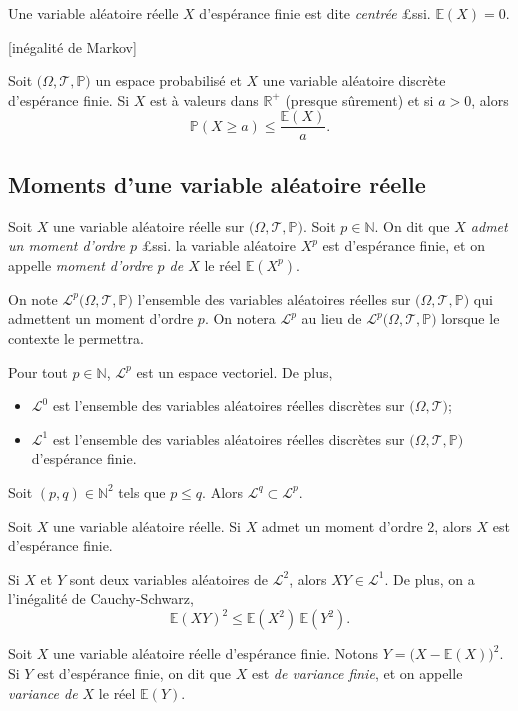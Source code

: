 \documentclass{yann}
\renewcommand{\T}{\mathscr{T}}
\newcommand{\Pro}{\bigl(Ω,\T\bigr)}
\newcommand{\Prob}{\bigl(Ω,\T,ℙ\bigr)}
\newcommand{\LL}[1]{\mathcal{L}^{#1}}
\begin{document}

Une variable aléatoire réelle $X$ d'espérance finie est dite \emph{centrée} £ssi. $𝔼(X) = 0$.

[inégalité de Markov]

Soit $\Prob$ un espace probabilisé et $X$ une variable aléatoire discrète d'espérance finie.
Si $X$ est à valeurs dans $ℝ^+$ (presque sûrement) et si $a > 0$, alors
\[ ℙ(X≥a) ≤ \frac{𝔼(X)}{a}. \]

\subsection{Moments d'une variable aléatoire réelle}


Soit $X$ une variable aléatoire réelle sur $\Prob$.
Soit $p∈ℕ$.
On dit que \emph{$X$ admet un moment d'ordre $p$} £ssi. la variable aléatoire $X^p$ est d'espérance finie,
et on appelle \emph{moment d'ordre $p$ de $X$} le réel $𝔼(X^p)$.

On note $\LL p\Prob$ l'ensemble des variables aléatoires réelles sur $\Prob$ qui admettent un moment d'ordre $p$.
On notera $\LL p$ au lieu de $\LL p\Prob$ lorsque le contexte le permettra.


Pour tout $p∈ℕ$, $\LL p$ est un espace vectoriel.
De plus,
\begin{itemize}
\item
  $\LL0$ est l'ensemble des variables aléatoires réelles discrètes sur $\Pro$;
\item
  $\LL1$ est l'ensemble des variables aléatoires réelles discrètes sur $\Prob$ d'espérance finie.
\end{itemize}


Soit $(p,q)∈ℕ^2$ tels que $p≤q$.
Alors $\LL q ⊂\LL p$.


Soit $X$ une variable aléatoire réelle. Si $X$ admet un moment d'ordre 2,
alors $X$ est d'espérance finie.


Si $X$ et $Y$ sont deux variables aléatoires de $\LL2$,
alors $XY∈\LL1$.
De plus, on a l'inégalité de Cauchy-Schwarz,
\[ 𝔼(XY)^2 ≤𝔼(X^2) \,𝔼(Y^2). \]


Soit $X$ une variable aléatoire réelle d'espérance finie.
Notons $Y = \bigl(X -𝔼(X)\bigr)^2$.
Si $Y$ est d'espérance finie,
on dit que $X$ est \emph{de variance finie},
et on appelle \emph{variance de $X$} le réel $𝔼(Y)$.
\end{document}
